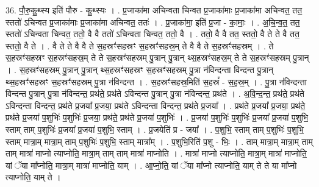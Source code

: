\documentclass[17pt]{extarticle}
\begin{document}
36. पौ॒रु॒कु॒थ्स्य इति॑ पौरु - कु॒थ्स्यः । . प्र॒जाका॑मा अचिन्वता चिन्वत प्र॒जाका॑माः प्र॒जाका॑मा अचिन्वत॒ तत॒ स्ततो॑ ऽचिन्वत प्र॒जाका॑माः प्र॒जाका॑मा अचिन्वत॒ ततः॑ । . प्र॒जाका॑मा॒ इति॑ प्र॒जा - का॒माः॒ । . अ॒चि॒न्व॒त॒ तत॒ स्ततो॑ ऽचिन्वता चिन्वत॒ ततो॒ वै वै ततो॑ ऽचिन्वता चिन्वत॒ ततो॒ वै । . ततो॒ वै वै तत॒ स्ततो॒ वै ते ते वै तत॒ स्ततो॒ वै ते । . वै ते ते वै वै ते स॒हस्रꣳ॑सहस्रꣳ स॒हस्रꣳ॑सहस्र॒म् ते वै वै ते स॒हस्रꣳ॑सहस्रम् । . ते स॒हस्रꣳ॑सहस्रꣳ स॒हस्रꣳ॑सहस्र॒म् ते ते स॒हस्रꣳ॑सहस्रम् पु॒त्रान् पु॒त्रान् थ्स॒हस्रꣳ॑सहस्र॒म् ते ते स॒हस्रꣳ॑सहस्रम् पु॒त्रान् । . स॒हस्रꣳ॑सहस्रम् पु॒त्रान् पु॒त्रान् थ्स॒हस्रꣳ॑सहस्रꣳ स॒हस्रꣳ॑सहस्रम् पु॒त्रा न॑विन्दन्ता विन्दन्त पु॒त्रान् थ्स॒हस्रꣳ॑सहस्रꣳ स॒हस्रꣳ॑सहस्रम् पु॒त्रा न॑विन्दन्त । . स॒हस्रꣳ॑सहस्र॒मिति॑ स॒हस्रं᳚ - स॒ह॒स्र॒म् । . पु॒त्रा न॑विन्दन्ता विन्दन्त पु॒त्रान् पु॒त्रा न॑विन्दन्त॒ प्रथ॑ते॒ प्रथ॑ते ऽविन्दन्त पु॒त्रान् पु॒त्रा न॑विन्दन्त॒ प्रथ॑ते । . अ॒वि॒न्द॒न्त॒ प्रथ॑ते॒ प्रथ॑ते ऽविन्दन्ता विन्दन्त॒ प्रथ॑ते प्र॒जया᳚ प्र॒जया॒ प्रथ॑ते ऽविन्दन्ता विन्दन्त॒ प्रथ॑ते प्र॒जया᳚ । . प्रथ॑ते प्र॒जया᳚ प्र॒जया॒ प्रथ॑ते॒ प्रथ॑ते प्र॒जया॑ प॒शुभिः॑ प॒शुभिः॑ प्र॒जया॒ प्रथ॑ते॒ प्रथ॑ते प्र॒जया॑ प॒शुभिः॑ । . प्र॒जया॑ प॒शुभिः॑ प॒शुभिः॑ प्र॒जया᳚ प्र॒जया॑ प॒शुभि॒ स्ताम् ताम् प॒शुभिः॑ प्र॒जया᳚ प्र॒जया॑ प॒शुभि॒ स्ताम् । . प्र॒जयेति॑ प्र - जया᳚ । . प॒शुभि॒ स्ताम् ताम् प॒शुभिः॑ प॒शुभि॒ स्ताम् मात्रा॒म् मात्रा॒म् ताम् प॒शुभिः॑ प॒शुभि॒ स्ताम् मात्रा᳚म् । . प॒शुभि॒रिति॑ प॒शु - भिः॒ । . ताम् मात्रा॒म् मात्रा॒म् ताम् ताम् मात्रा॑ माप्नो त्याप्नोति॒ मात्रा॒म् ताम् ताम् मात्रा॑ माप्नोति । . मात्रा॑ माप्नो त्याप्नोति॒ मात्रा॒म् मात्रा॑ माप्नोति॒ यां ॅया मा᳚प्नोति॒ मात्रा॒म् मात्रा॑ माप्नोति॒ याम् । . आ॒प्नो॒ति॒ यां ॅया मा᳚प्नो त्याप्नोति॒ याम् ते ते या मा᳚प्नो त्याप्नोति॒ याम् ते । \newline
\end{document}
